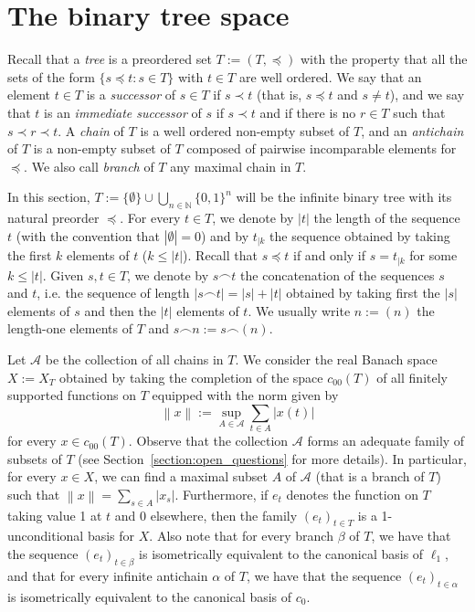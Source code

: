 \documentclass[11pt,a4paper,reqno]{amsart}
\numberwithin{equation}{section}
\newcommand{\abs}[1]{\left\lvert#1\right\rvert}
\newcommand{\norm}[1]{\left\lVert#1\right\rVert}
\newcommand{\N}{\mathbb{N}}
\newcommand{\A}{\mathcal{A}}
\newcommand{\1}{\mathbbm{1}}
\renewcommand{\leq}{\leqslant}
\theoremstyle{plain}
\theoremstyle{definition}
\begin{document}
\section{The binary tree space}\label{section:binary_tree_space}

Recall that a \emph{tree} is a preordered set $T:=(T,\preceq)$ with the property that all the sets of the form $\{s\preceq t\colon s\in T\}$ with $t\in T$ are well ordered. We say that an element $t\in T$ is a \emph{successor} of $s\in T$ if $s\prec t$ (that is, $s\preceq t$ and $s\neq t$), and we say that $t$ is an \emph{immediate successor} of $s$ if $s\prec t$ and if there is no $r\in T$ such that $s\prec r \prec t$. A \emph{chain} of $T$ is a well ordered non-empty subset of $T$, and an \emph{antichain} of $T$ is a non-empty subset of $T$ composed of pairwise incomparable elements for $\preceq$. We also call \emph{branch} of $T$ any maximal chain in $T$. 

In this section, $T:=\{\emptyset\}\cup\bigcup_{n\in\N}\{0,1\}^n$ will be the infinite binary tree with its natural preorder $\preceq$. For every $t\in T$, we denote by $\abs{t}$ the length of the sequence $t$ (with the convention that $\abs{\emptyset}=0$) and by $t_{\lvert k}$ the sequence obtained by taking the first $k$ elements of $t$ ($k\leq \abs{t}$). Recall that $s\preceq t$ if and only if $s=t_{\lvert k}$ for some $k\leq\abs{t}$. Given $s,t\in T$, we denote by $s\smallfrown t$ the concatenation of the sequences $s$ and $t$, i.e. the sequence of length $\abs{s\smallfrown t}=\abs{s}+\abs{t}$ obtained by taking first the $\abs{s}$ elements of $s$ and then the $\abs{t}$ elements of $t$. We usually write $n:=(n)$ the length-one elements of $T$ and $s\smallfrown n:=s\smallfrown (n)$. 

Let $\A$ be the collection of all chains in $T$. We consider the real Banach space $X:=X_T$ obtained by taking the completion of the space $c_{00}(T)$ of all finitely supported functions on $T$ equipped with the norm given by \begin{equation*}
\norm{x}:=\sup_{A\in \A}\sum_{t\in A}\abs{x(t)}
\end{equation*} for every $x\in c_{00}(T)$. Observe that the collection $\A$ forms an adequate family of subsets of $T$ (see Section~\ref{section:open_questions} for more details). In particular, for every $x\in X$, we can find a maximal subset $A$ of $\A$ (that is a branch of $T$) such that $\norm{x}=\sum_{s\in A}\abs{x_s}$. Furthermore, if $e_t$ denotes the function on $T$ taking value 1 at $t$ and $0$ elsewhere, then the family $(e_t)_{t\in T}$ is a 1-unconditional basis for $X$. Also note that for every branch $\beta$ of $T$, we have that the sequence $(e_t)_{t\in\beta}$ is isometrically equivalent to the canonical basis of $\ell_1$, and that for every infinite antichain $\alpha$ of $T$, we have that the sequence $(e_t)_{t\in\alpha}$ is isometrically equivalent to the canonical basis of $c_0$. 
\end{document}
